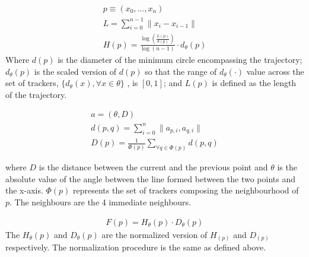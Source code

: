 \documentclass{article}
\begin{document}
\begin{align}
p \equiv (x_0,\ldots,x_n)\\
L = \sum_{i=0}^{n-1} \| x_i - x_{i-1} \| \\
H(p) = \frac{\log(\frac{L(p)}{d(p)})}{\log(n-1)}\cdot d_\theta (p)
\end{align}
Where $d(p)$ is the diameter of the minimum circle encompassing the trajectory; $d_\theta(p)$ is the scaled version of $d(p)$ so that the range of $d_\theta(\cdot)$ value across the set of trackers, $\{ d_\theta (x), \forall x \in \theta \}$ , is $[0,1]$; and $L(p)$ is defined as the length of the trajectory.

\begin{align}
a = (\theta , D)\\
d(p,q) = \sum_{i=0}^{n} \| a_{p,i} , a_{q,i} \| \\
D(p) = \frac{1}{\Phi (p)} \sum_{\forall q \in \Phi (p)} d (p,q)
\end{align}

where $D$ is the distance between the current and the previous point and $\theta$ is the absolute value of the angle between the line formed between the two points and the x-axis. $\Phi (p)$ represents the set of trackers composing the neighbourhood of $p$. The neighbours are the 4 immediate neighbours.

\begin{align}
F(p) = H_\theta(p) \cdot D_\theta(p)
\end{align}
The $H_\theta(p)$ and $D_\theta(p)$ are the normalized version of $H_(p)$ and $D_(p)$ respectively. The normalization procedure is the same as defined above.
\end{document}
